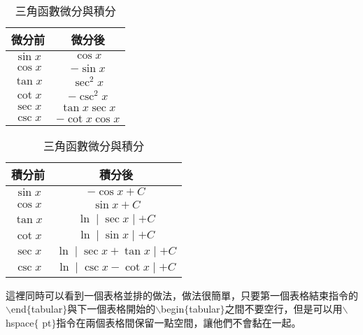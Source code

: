 \begin{table}[H] 
	\centering 
	\caption{三角函數微分與積分}\label{sin}  
	\extrarowheight=3pt 
	\begin{tabular}{cc}
	\rowcolor[gray]{.9}
	微分前 & 微分後 \\\toprule[1.5pt]
	$\sin x$ & $\cos x$  \\\hline	
	$\cos x$ & $-\sin x$  \\\hline	
	\cellcolor{slight}$\tan x$ & $\sec^2 x$  \\\hline	
	$\cot x$ & $-\csc^2 x$  \\\hline	
	$\sec x$ & $\tan x\sec x$  \\\hline	
	$\csc x$ & \cellcolor{slight}$-\cot x\cos x$  \\\bottomrule	
	\end{tabular}\hspace{20pt}
	\begin{tabular}{cc}	
	\rowcolor[gray]{.9}	
	積分前 & 積分後 \\\toprule[1.5pt]
	$\sin x$ & $-\cos x +C$  \\\hline
	\rowcolor[gray]{.9}	
	$\cos x$ & $\sin x +C$  \\\hline	
	$\tan x$ & $\ln\mid \sec x\mid +C$  \\\hline	
	\rowcolor[gray]{.9}	
	$\cot x$ & $\ln\mid \sin x\mid +C$  \\\hline	
	$\sec x$ & $\ln\mid \sec x+\tan x\mid +C$  \\\hline	
	\rowcolor[gray]{.9}	
	$\csc x$ & $\ln\mid \csc x-\cot x\mid +C$  \\\bottomrule	
	\end{tabular}
\end{table}

這裡同時可以看到一個表格並排的做法，做法很簡單，只要第一個表格結束指令的$\backslash$end$\lbrace$tabular$\rbrace$與下一個表格開始的$\backslash$begin$\lbrace$tabular$\rbrace$之間不要空行，但是可以用$\backslash$hspace$\lbrace$ pt$\rbrace$指令在兩個表格間保留一點空間，讓他們不會黏在一起。\\


